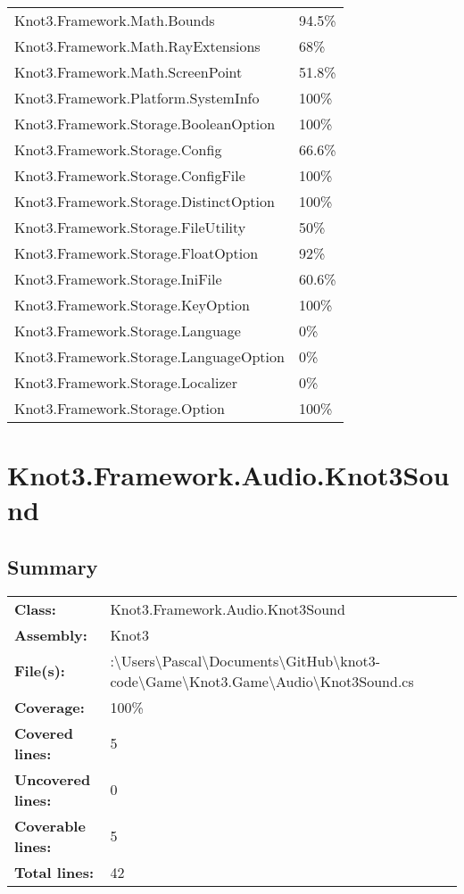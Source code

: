 \documentclass[a4paper,10pt]{article}
\begin{document}
\begin{longtable}[l]{ll}
Knot3.Framework.Math.Bounds & 94.5\%\\
Knot3.Framework.Math.RayExtensions & 68\%\\
Knot3.Framework.Math.ScreenPoint & 51.8\%\\
Knot3.Framework.Platform.SystemInfo & 100\%\\
Knot3.Framework.Storage.BooleanOption & 100\%\\
Knot3.Framework.Storage.Config & 66.6\%\\
Knot3.Framework.Storage.ConfigFile & 100\%\\
Knot3.Framework.Storage.DistinctOption & 100\%\\
Knot3.Framework.Storage.FileUtility & 50\%\\
Knot3.Framework.Storage.FloatOption & 92\%\\
Knot3.Framework.Storage.IniFile & 60.6\%\\
Knot3.Framework.Storage.KeyOption & 100\%\\
Knot3.Framework.Storage.Language & 0\%\\
Knot3.Framework.Storage.LanguageOption & 0\%\\
Knot3.Framework.Storage.Localizer & 0\%\\
Knot3.Framework.Storage.Option & 100\%\\
\end{longtable}
\newpage
\section{Knot3.Framework.Audio.Knot3Sound}
\subsection{Summary}
\begin{longtable}[l]{ll}
\textbf{Class:} & Knot3.Framework.Audio.Knot3Sound\\
\textbf{Assembly:} & Knot3\\
\textbf{File(s):} & \begin{minipage}[t]{12cm}{:\textbackslash Users\textbackslash Pascal\textbackslash Documents\textbackslash GitHub\textbackslash knot3-code\textbackslash Game\textbackslash Knot3.Game\textbackslash Audio\textbackslash Knot3Sound.cs}\end{minipage} \\
\textbf{Coverage:} & 100\%\\
\textbf{Covered lines:} & 5\\
\textbf{Uncovered lines:} & 0\\
\textbf{Coverable lines:} & 5\\
\textbf{Total lines:} & 42\\
\end{longtable}
\end{document}
